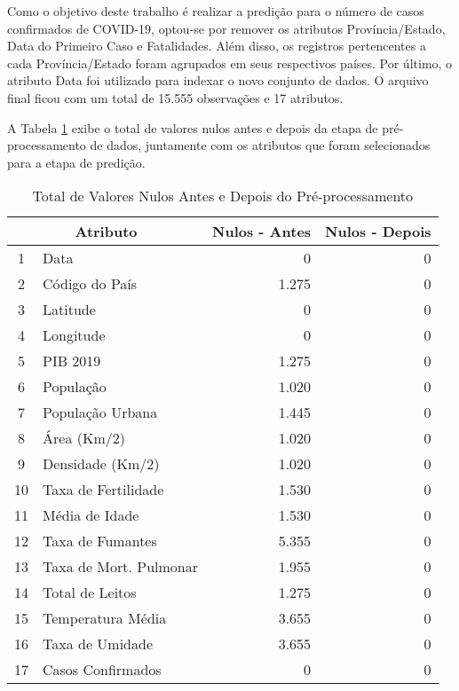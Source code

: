 \documentclass{ieeeaccess}
\begin{document}
Como o objetivo deste trabalho é realizar a predição para o número de casos confirmados de COVID-19, optou-se por remover os atributos Província/Estado, Data do Primeiro Caso e Fatalidades. Além disso, os registros pertencentes a cada Província/Estado foram agrupados em seus respectivos países. Por último, o atributo Data foi utilizado para indexar o novo conjunto de dados. O arquivo final ficou com um total de 15.555 observações e 17 atributos. 

A Tabela \ref{tab3} exibe o total de valores nulos antes e depois da etapa de pré-processamento de dados, juntamente com os atributos que foram selecionados para a etapa de predição. 

\begin{table}[t]
	\caption{Total de Valores Nulos Antes e Depois do Pré-processamento}
	\label{tab3}
	\setlength{\tabcolsep}{3pt}
	\setlength\extrarowheight{2.5pt}
	
	\centering
	\begin{tabular}{| c | l |  r | r |}
		\hline
		\multicolumn{2}{|c|}{Atributo} &\multicolumn{1}{c|}{Nulos - Antes} & \multicolumn{1}{c|}{Nulos - Depois} \\ \hline
		
		1  & Data & 0 &  0 \\
		2 & Código do País & 1.275 & 0 \\
		3 & Latitude & 0 &  0 \\
		4 & Longitude & 0 &  0 \\
		5 & PIB 2019 & 1.275 &  0 \\
		6 & População & 1.020 &  0 \\
		7 & População Urbana & 1.445 &  0 \\
		8 & Área (Km/2) & 1.020 & 0 \\
		9 & Densidade (Km/2) & 1.020 &  0 \\
		10 & Taxa de Fertilidade & 1.530 &  0 \\
		11 & Média de Idade & 1.530 &  0 \\
		12 & Taxa de Fumantes & 5.355 & 0 \\
		13 & Taxa de Mort. Pulmonar & 1.955 &  0 \\
		14 & Total de Leitos & 1.275 &  0 \\
		15 & Temperatura Média & 3.655 &  0\\
		16 & Taxa de Umidade & 3.655 & 0 \\
		17 & Casos Confirmados & 0 & 0 \\ \hline
		
	\end{tabular}
\end{table}
\end{document}
